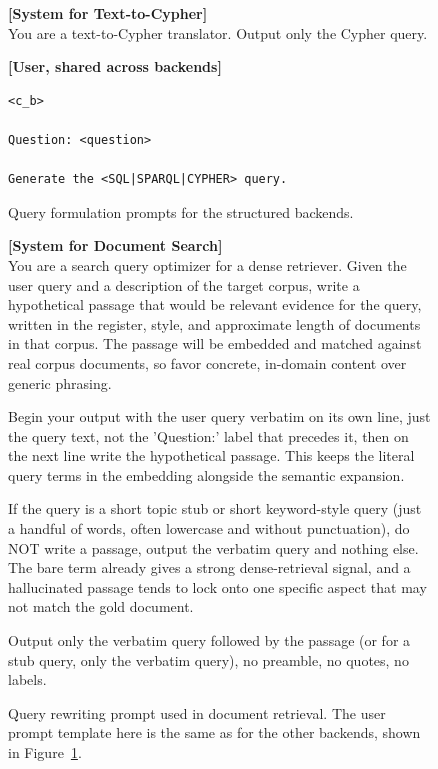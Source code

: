 \documentclass{llmxive}
\begin{document}
{\begin{figure}
\begin{promptbox}
\textbf{[System for Text-to-Cypher]}\\[2pt]
You are a text-to-Cypher translator. Output only the Cypher query.

\tcbline

\textbf{[User, shared across backends]}\\[2pt]
\begin{verbatim}
<c_b>

Question: <question>

Generate the <SQL|SPARQL|CYPHER> query.
\end{verbatim}
\end{promptbox}
\caption{Query formulation prompts for the structured backends.}
\label{fig:query_formulation_prompt}
\end{figure}


\begin{figure}
\centering
\begin{promptbox}
\textbf{[System for Document Search]}\\[2pt]
You are a search query optimizer for a dense retriever. Given the user query and a description of the target corpus, write a hypothetical passage that would be relevant evidence for the query, written in the register, style, and approximate length of documents in that corpus. The passage will be embedded and matched against real corpus documents, so favor concrete, in-domain content over generic phrasing.

Begin your output with the user query verbatim on its own line, just the query text, not the 'Question:' label that precedes it, then on the next line write the hypothetical passage. This keeps the literal query terms in the embedding alongside the semantic expansion.

If the query is a short topic stub or short keyword-style query (just a handful of words, often lowercase and without punctuation), do NOT write a passage, output the verbatim query and nothing else. The bare term already gives a strong dense-retrieval signal, and a hallucinated passage tends to lock onto one specific aspect that may not match the gold document.

Output only the verbatim query followed by the passage (or for a stub query, only the verbatim query), no preamble, no quotes, no labels.
\end{promptbox}
\caption{Query rewriting prompt used in document retrieval. The user prompt template here is the same as for the other backends, shown in Figure~\ref{fig:query_formulation_prompt}.}
\label{fig:search_rewriting_prompt}
\end{figure}


}
\end{document}
